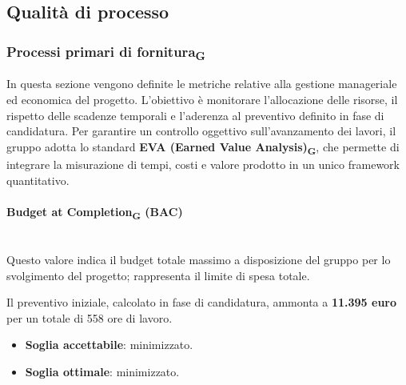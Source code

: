 \documentclass[11pt,a4paper]{article}
\newcommand{\gls}[1]{#1\textsubscript{G}}
\begin{document}
\subsection{Qualità di processo}

\subsubsection{\gls{Processi primari di fornitura}}
In questa sezione vengono definite le metriche relative alla gestione manageriale ed economica del progetto. L'obiettivo è monitorare l'allocazione delle risorse, il rispetto delle scadenze temporali e l'aderenza al preventivo definito in fase di candidatura.
Per garantire un controllo oggettivo sull'avanzamento dei lavori, il gruppo adotta lo standard \textbf{EVA (Earned Value Analysis)\textsubscript{G}}, che permette di integrare la misurazione di tempi, costi e valore prodotto in un unico framework quantitativo.

\paragraph{Budget at Completion\textsubscript{G} (BAC)} \hfill \\
Questo valore indica il budget totale massimo a disposizione del gruppo per lo svolgimento del progetto; rappresenta il limite di spesa totale.

Il preventivo iniziale, calcolato in fase di candidatura, ammonta a \textbf{11.395 euro} per un totale di 558 ore di lavoro.
\begin{itemize}
    \item \textbf{Soglia accettabile}: minimizzato.
    \item \textbf{Soglia ottimale}: minimizzato.
\end{itemize}
\end{document}

